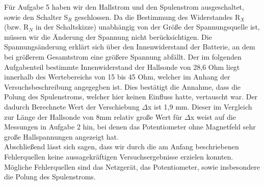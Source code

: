 \documentclass[12pt]{scrartcl}
\begin{document}
Für Aufgabe 5 haben wir den Hallstrom und den Spulenstrom ausgeschaltet, sowie den Schalter S$_R$ geschlossen. Da die Bestimmung des Widerstandes R$_X$ (bzw. R$_N$ in der Schaltskizze) unabhängig von der Größe der Spannungsquelle ist, müssen wir die Änderung der Spannung nicht berücksichtigen. Die Spannungsänderung erklärt sich über den Innenwiderstand der Batterie, an dem bei größerem Gesamtstrom eine größere Spannung abfällt. Der im folgenden Aufgabenteil bestimmte Innenwiderstand der Hallsonde von 28,6 Ohm liegt innerhalb des Wertebereichs von 15 bis 45 Ohm, welcher im Anhang der Versuchsbeschreibung angegegben ist. Dies bestätigt die Annahme, dass die Polung des Spulenstroms, welcher hier keinen Einfluss hatte, vertauscht war. Der dadurch Berechnete Wert der Verschiebung $\Delta$x ist 1,9 mm. Dieser im Vergleich zur Länge der Hallsonde von 8mm relativ große Wert für $\Delta$x weist auf die  Messungen in Aufgabe 2 hin, bei denen das Potentiometer ohne Magnetfeld sehr große Hallspannungen angezeigt hat.\\
Abschließend lässt sich sagen, dass wir durch die am Anfang beschriebenen Fehlerquellen keine aussagekräftigen Versuchsergebnisse erzielen konnten. Mögliche Fehlerquellen sind das Netzgerät, das Potentiometer, sowie insbesondere die Polung des Spulenstroms.  
\end{document}
